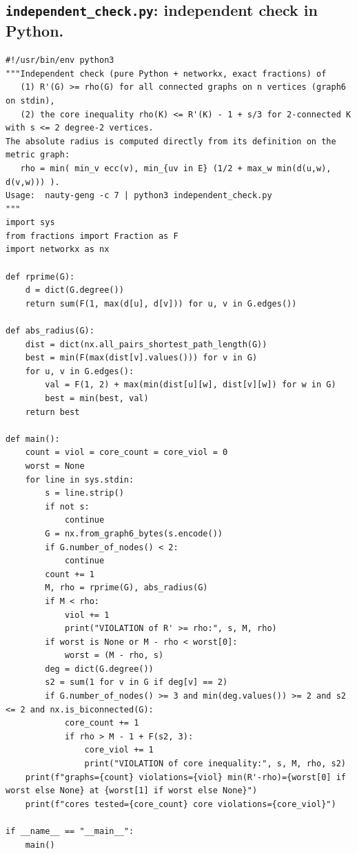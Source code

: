 \documentclass[11pt]{amsart}
\theoremstyle{definition}
\begin{document}
\subsection*{\texttt{independent\_check.py}: independent check in Python.}
\begin{lstlisting}
#!/usr/bin/env python3
"""Independent check (pure Python + networkx, exact fractions) of
   (1) R'(G) >= rho(G) for all connected graphs on n vertices (graph6 on stdin),
   (2) the core inequality rho(K) <= R'(K) - 1 + s/3 for 2-connected K with s <= 2 degree-2 vertices.
The absolute radius is computed directly from its definition on the metric graph:
   rho = min( min_v ecc(v), min_{uv in E} (1/2 + max_w min(d(u,w), d(v,w))) ).
Usage:  nauty-geng -c 7 | python3 independent_check.py
"""
import sys
from fractions import Fraction as F
import networkx as nx

def rprime(G):
    d = dict(G.degree())
    return sum(F(1, max(d[u], d[v])) for u, v in G.edges())

def abs_radius(G):
    dist = dict(nx.all_pairs_shortest_path_length(G))
    best = min(F(max(dist[v].values())) for v in G)
    for u, v in G.edges():
        val = F(1, 2) + max(min(dist[u][w], dist[v][w]) for w in G)
        best = min(best, val)
    return best

def main():
    count = viol = core_count = core_viol = 0
    worst = None
    for line in sys.stdin:
        s = line.strip()
        if not s:
            continue
        G = nx.from_graph6_bytes(s.encode())
        if G.number_of_nodes() < 2:
            continue
        count += 1
        M, rho = rprime(G), abs_radius(G)
        if M < rho:
            viol += 1
            print("VIOLATION of R' >= rho:", s, M, rho)
        if worst is None or M - rho < worst[0]:
            worst = (M - rho, s)
        deg = dict(G.degree())
        s2 = sum(1 for v in G if deg[v] == 2)
        if G.number_of_nodes() >= 3 and min(deg.values()) >= 2 and s2 <= 2 and nx.is_biconnected(G):
            core_count += 1
            if rho > M - 1 + F(s2, 3):
                core_viol += 1
                print("VIOLATION of core inequality:", s, M, rho, s2)
    print(f"graphs={count} violations={viol} min(R'-rho)={worst[0] if worst else None} at {worst[1] if worst else None}")
    print(f"cores tested={core_count} core violations={core_viol}")

if __name__ == "__main__":
    main()
\end{lstlisting}
\end{document}

